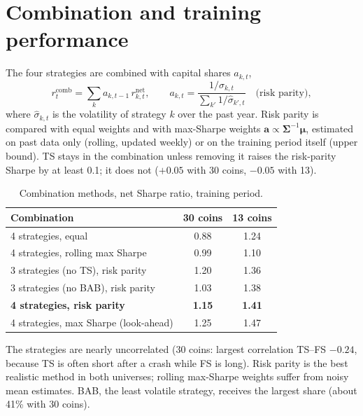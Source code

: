 \documentclass[aps,prl,onecolumn,superscriptaddress,nofootinbib]{revtex4-2}
\begin{document}
	\section{Combination and training performance}
	\label{sec:combo}

	The four strategies are combined with capital shares $a_{k,t}$,
	\begin{equation}
		r^{\mathrm{comb}}_t = \sum_{k} a_{k,t-1}\, r^{\mathrm{net}}_{k,t}, \qquad
		a_{k,t} = \frac{1/\hat\sigma_{k,t}}{\sum_{k'} 1/\hat\sigma_{k',t}} \quad \text{(risk parity)},
		\label{eq:combo}
	\end{equation}
	where $\hat\sigma_{k,t}$ is the volatility of strategy $k$ over the past year. Risk parity is compared with equal weights and with max-Sharpe weights $\bm a \propto \bm\Sigma^{-1}\bm\mu$, estimated on past data only (rolling, updated weekly) or on the training period itself (upper bound). TS stays in the combination unless removing it raises the risk-parity Sharpe by at least 0.1; it does not ($+0.05$ with 30 coins, $-0.05$ with 13).

	\begin{table}[!htbp]
		\caption{Combination methods, net Sharpe ratio, training period.}
		\label{tab:combo}
		\begin{ruledtabular}
			\begin{tabular}{lcc}
				Combination & 30 coins & 13 coins \\
				\hline
				4 strategies, equal                    & 0.88 & 1.24 \\
				4 strategies, rolling max Sharpe       & 0.99 & 1.10 \\
				3 strategies (no TS), risk parity      & 1.20 & 1.36 \\
				3 strategies (no BAB), risk parity     & 1.03 & 1.38 \\
				\textbf{4 strategies, risk parity}     & \textbf{1.15} & \textbf{1.41} \\
				4 strategies, max Sharpe (look-ahead)  & 1.25 & 1.47 \\
			\end{tabular}
		\end{ruledtabular}
	\end{table}

	The strategies are nearly uncorrelated (30 coins: largest correlation TS--FS $-0.24$, because TS is often short after a crash while FS is long). Risk parity is the best realistic method in both universes; rolling max-Sharpe weights suffer from noisy mean estimates. BAB, the least volatile strategy, receives the largest share (about 41\% with 30 coins).
\end{document}
